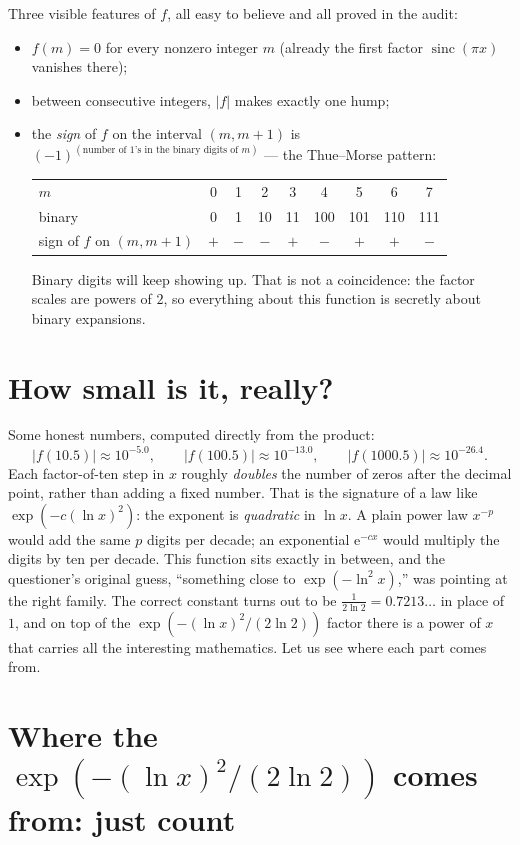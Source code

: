 \documentclass[11pt,oneside]{article}
\theoremstyle{remark}
\newcommand{\e}{\mathrm e}
\newcommand{\sinc}{\operatorname{sinc}}
\begin{document}
Three visible features of $f$, all easy to believe and all proved in
the audit:
\begin{itemize}
\item $f(m)=0$ for every nonzero integer $m$ (already the first factor
$\sinc(\pi x)$ vanishes there);
\item between consecutive integers, $|f|$ makes exactly one hump;
\item the \emph{sign} of $f$ on the interval $(m,m+1)$ is
$(-1)^{(\text{number of 1's in the binary digits of }m)}$ --- the
Thue--Morse pattern:
\begin{center}
\begin{tabular}{@{}l*{8}{c}@{}}
\toprule
$m$ & 0 & 1 & 2 & 3 & 4 & 5 & 6 & 7\\
binary & 0 & 1 & 10 & 11 & 100 & 101 & 110 & 111\\
sign of $f$ on $(m,m+1)$ & $+$ & $-$ & $-$ & $+$ & $-$ & $+$ & $+$ & $-$\\
\bottomrule
\end{tabular}
\end{center}
Binary digits will keep showing up.  That is not a coincidence: the
factor scales are powers of $2$, so everything about this function is
secretly about binary expansions.
\end{itemize}

\section{How small is it, really?}

Some honest numbers, computed directly from the product:
\[
 |f(10.5)|\approx10^{-5.0},\qquad
 |f(100.5)|\approx10^{-13.0},\qquad
 |f(1000.5)|\approx10^{-26.4}.
\]
Each factor-of-ten step in $x$ roughly \emph{doubles} the number of
zeros after the decimal point, rather than adding a fixed number.
That is the signature of a law like
$\exp(-c(\ln x)^2)$: the exponent is \emph{quadratic} in $\ln x$.  A
plain power law $x^{-p}$ would add the same $p$ digits per decade;
an exponential $\e^{-cx}$ would multiply the digits by ten per decade.
This function sits exactly in between, and the questioner's original
guess, ``something close to $\exp(-\ln^2x)$,'' was pointing at the
right family.  The correct constant turns out to be
$\frac{1}{2\ln2}=0.7213\ldots$ in place of $1$, and on top of the
$\exp(-(\ln x)^2/(2\ln2))$ factor there is a power of $x$ that carries
all the interesting mathematics.  Let us see where each part comes
from.

\section{Where the \texorpdfstring{$\exp(-(\ln x)^2/(2\ln2))$}{exp(-ln²x/2ln2)} comes from: just count}
\end{document}
